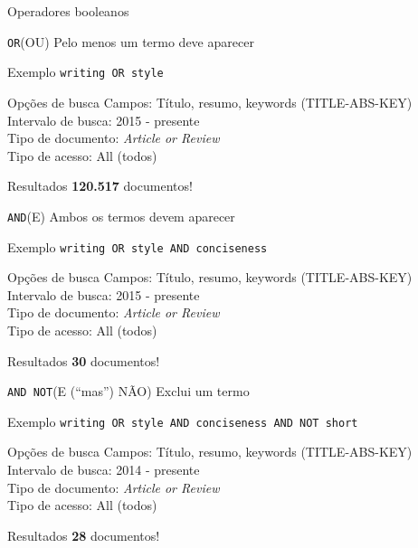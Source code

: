 \begin{frame}{Operadores booleanos}
\begin{block}{\texttt{OR}(OU)}
Pelo menos um termo deve aparecer
\end{block}
\begin{block}{Exemplo}
\texttt{writing OR style}
\end{block}
\begin{block}{Opções de busca}
Campos: Título, resumo, keywords (TITLE-ABS-KEY) \\
Intervalo de busca: 2015 - presente \\
Tipo de documento: \emph{Article or Review} \\
Tipo de acesso: All (todos) 
\end{block}
\begin{block}{Resultados}
\textbf{120.517} documentos!
\end{block}
\end{frame}

\begin{frame}
\begin{block}{\texttt{AND}(E)}
Ambos os termos devem aparecer
\end{block}
\begin{block}{Exemplo}
\texttt{writing OR style AND conciseness}
\end{block}
\begin{block}{Opções de busca}
Campos: Título, resumo, keywords (TITLE-ABS-KEY) \\
Intervalo de busca: 2015 - presente \\
Tipo de documento: \emph{Article or Review} \\
Tipo de acesso: All (todos) 
\end{block}
\begin{block}{Resultados}
\textbf{30} documentos!
\end{block}
\end{frame}

\begin{frame}
\begin{block}{\texttt{AND NOT}(E (``mas'') NÃO)}
Exclui um termo
\end{block}
\begin{block}{Exemplo}
\texttt{writing OR style AND conciseness AND NOT short}
\end{block}
\begin{block}{Opções de busca}
Campos: Título, resumo, keywords (TITLE-ABS-KEY) \\
Intervalo de busca: 2014 - presente \\
Tipo de documento: \emph{Article or Review} \\
Tipo de acesso: All (todos) 
\end{block}
\begin{block}{Resultados}
\textbf{28} documentos!
\end{block}
\end{frame}


